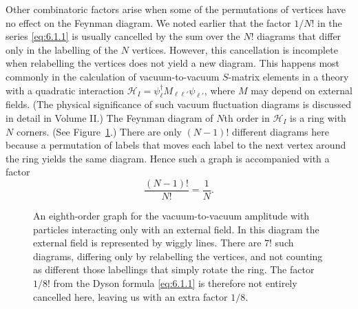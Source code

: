 
Other combinatoric factors arise when some of the permutations of vertices
have no effect on the Feynman diagram. We noted earlier that the factor $1/N!$
in the series \eqref{eq:6.1.1} is usually cancelled by the sum over the $N!$ diagrams
that differ only in the labelling of the $N$ vertices. However, this
cancellation is incomplete when relabelling the vertices does not yield a new
diagram. This happens most commonly in the calculation of vacuum-to-vacuum
$S$-matrix elements in a theory with a quadratic interaction
$\mathcal H_I=\psi_\ell^\dagger M_{\ell\ell'}\psi_{\ell'}$, where $M$ may
depend on external fields. (The physical significance of such vacuum
fluctuation diagrams is discussed in detail in Volume II.) The Feynman diagram
of $N$th order in $\mathcal H_I$ is a ring with $N$ corners. (See Figure~\ref{fig:6.3}.)
There are only $(N-1)!$ different diagrams here because a permutation of labels
that moves each label to the next vertex around the ring yields the same
diagram. Hence such a graph is accompanied with a factor
\begin{equation}
\frac{(N-1)!}{N!}=\frac{1}{N}.
\tag{6.1.17}
\label{eq:6.1.17}
\end{equation}

\begingroup
\renewcommand{\thefigure}{6.\arabic{figure}}
\setcounter{figure}{2}
\begin{figure}[htbp]

\caption{An eighth-order graph for the vacuum-to-vacuum amplitude with
particles interacting only with an external field. In this diagram the
external field is represented by wiggly lines. There are $7!$ such diagrams,
differing only by relabelling the vertices, and not counting as different those
labellings that simply rotate the ring. The factor $1/8!$ from the Dyson
formula \eqref{eq:6.1.1} is therefore not entirely cancelled here, leaving us
with an extra factor $1/8$.}
\label{fig:6.3}
\end{figure}
\endgroup

